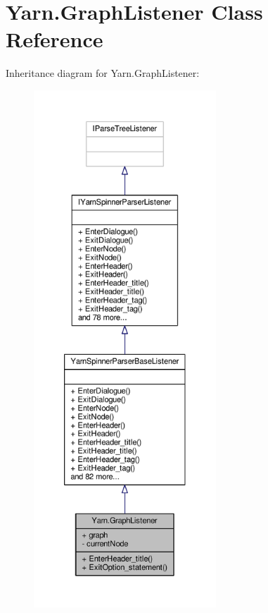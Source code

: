 \hypertarget{a00109}{\section{Yarn.\-Graph\-Listener Class Reference}
\label{a00109}
}


Inheritance diagram for Yarn.\-Graph\-Listener\-:
\nopagebreak
\begin{figure}[H]
\begin{center}
\leavevmode
\includegraphics[height=550pt]{a00599}
\end{center}
\end{figure}


